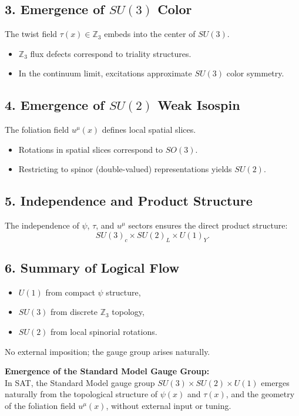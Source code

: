 \documentclass[12pt]{article}
\begin{document}
\subsection*{3. Emergence of \(SU(3)\) Color}
The twist field \(\tau(x) \in \mathbb{Z}_3\) embeds into the center of \(SU(3)\).
\begin{itemize}
    \item \(\mathbb{Z}_3\) flux defects correspond to triality structures.
    \item In the continuum limit, excitations approximate \(SU(3)\) color symmetry.
\end{itemize}

\subsection*{4. Emergence of \(SU(2)\) Weak Isospin}
The foliation field \(u^\mu(x)\) defines local spatial slices.
\begin{itemize}
    \item Rotations in spatial slices correspond to \(SO(3)\).
    \item Restricting to spinor (double-valued) representations yields \(SU(2)\).
\end{itemize}

\subsection*{5. Independence and Product Structure}
The independence of \(\psi\), \(\tau\), and \(u^\mu\) sectors ensures the direct product structure:
\[
SU(3)_c \times SU(2)_L \times U(1)_Y.
\]

\subsection*{6. Summary of Logical Flow}
\begin{itemize}
    \item \(U(1)\) from compact \(\psi\) structure,
    \item \(SU(3)\) from discrete \(\mathbb{Z}_3\) topology,
    \item \(SU(2)\) from local spinorial rotations.
\end{itemize}
No external imposition; the gauge group arises naturally.

\begin{mdframed}[linewidth=1pt, roundcorner=5pt, backgroundcolor=white]
\textbf{Emergence of the Standard Model Gauge Group:} \\
In SAT, the Standard Model gauge group \( SU(3) \times SU(2) \times U(1) \) emerges naturally from the topological structure of \( \psi(x) \) and \( \tau(x) \), and the geometry of the foliation field \( u^\mu(x) \), without external input or tuning.
\end{mdframed}
\end{document}
